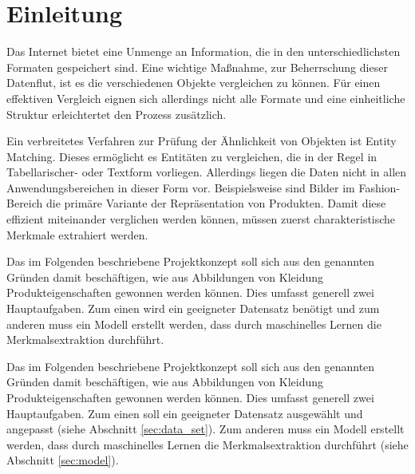 \section{Einleitung} \label{sec:intro}

Das Internet bietet eine Unmenge an Information, die in den unterschiedlichsten Formaten gespeichert sind. Eine wichtige Maßnahme, zur Beherrschung dieser Datenflut, ist es die verschiedenen Objekte vergleichen zu können. Für einen effektiven Vergleich eignen sich allerdings nicht alle Formate und eine einheitliche Struktur erleichtertet den Prozess zusätzlich.

Ein verbreitetes Verfahren zur Prüfung der Ähnlichkeit von Objekten ist Entity Matching. Dieses ermöglicht es Entitäten zu vergleichen, die in der Regel in Tabellarischer- oder Textform vorliegen. Allerdings liegen die Daten nicht in allen Anwendungsbereichen in dieser Form vor. Beispielsweise sind Bilder im Fashion-Bereich die primäre Variante der Repräsentation von Produkten. Damit diese effizient miteinander verglichen werden können, müssen zuerst charakteristische Merkmale extrahiert werden.

Das im Folgenden beschriebene Projektkonzept soll sich aus den genannten Gründen damit beschäftigen, wie aus Abbildungen von Kleidung Produkteigenschaften gewonnen werden können. Dies umfasst generell zwei Hauptaufgaben. Zum einen wird ein geeigneter Datensatz benötigt und zum anderen muss ein Modell erstellt werden, dass durch maschinelles Lernen die Merkmalsextraktion durchführt.

Das im Folgenden beschriebene Projektkonzept soll sich aus den genannten Gründen damit beschäftigen, wie aus Abbildungen von Kleidung Produkteigenschaften gewonnen werden können. Dies umfasst generell zwei Hauptaufgaben. Zum einen soll ein geeigneter Datensatz ausgewählt und angepasst (siehe Abschnitt \ref{sec:data_set}). Zum anderen muss ein Modell erstellt werden, dass durch maschinelles Lernen die Merkmalsextraktion durchführt (siehe Abschnitt \ref{sec:model}).